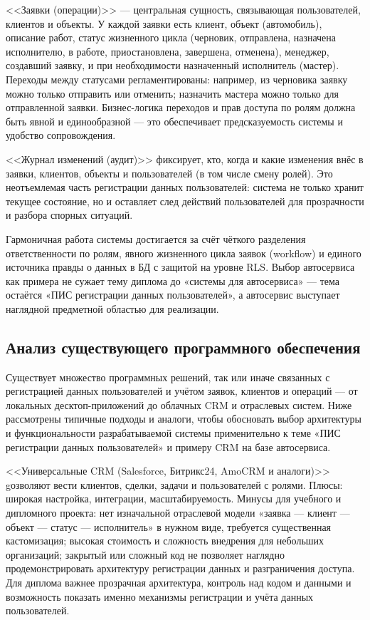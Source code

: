 <<Заявки (операции)>> — центральная сущность, связывающая пользователей, клиентов и объекты. У каждой заявки есть клиент, объект (автомобиль), описание работ, статус жизненного цикла (черновик, отправлена, назначена исполнителю, в работе, приостановлена, завершена, отменена), менеджер, создавший заявку, и при необходимости назначенный исполнитель (мастер). Переходы между статусами регламентированы: например, из черновика заявку можно только отправить или отменить; назначить мастера можно только для отправленной заявки. Бизнес-логика переходов и прав доступа по ролям должна быть явной и единообразной — это обеспечивает предсказуемость системы и удобство сопровождения.

<<Журнал изменений (аудит)>> фиксирует, кто, когда и какие изменения внёс в заявки, клиентов, объекты и пользователей (в том числе смену ролей). Это неотъемлемая часть регистрации данных пользователей: система не только хранит текущее состояние, но и оставляет след действий пользователей для прозрачности и разбора спорных ситуаций.

Гармоничная работа системы достигается за счёт чёткого разделения ответственности по ролям, явного жизненного цикла заявок (workflow) и единого источника правды о данных в БД с защитой на уровне RLS. Выбор автосервиса как примера не сужает тему диплома до «системы для автосервиса» — тема остаётся «ПИС регистрации данных пользователей», а автосервис выступает наглядной предметной областью для реализации.

\subsection{Анализ существующего программного обеспечения}

Существует множество программных решений, так или иначе связанных с регистрацией данных пользователей и учётом заявок, клиентов и операций — от локальных десктоп-приложений до облачных CRM и отраслевых систем. Ниже рассмотрены типичные подходы и аналоги, чтобы обосновать выбор архитектуры и функциональности разрабатываемой системы применительно к теме «ПИС регистрации данных пользователей» и примеру CRM на базе автосервиса.

<<Универсальные CRM (Salesforce, Битрикс24, AmoCRM и аналоги)>> gозволяют вести клиентов, сделки, задачи и пользователей с ролями. Плюсы: широкая настройка, интеграции, масштабируемость. Минусы для учебного и дипломного проекта: нет изначальной отраслевой модели «заявка — клиент — объект — статус — исполнитель» в нужном виде, требуется существенная кастомизация; высокая стоимость и сложность внедрения для небольших организаций; закрытый или сложный код не позволяет наглядно продемонстрировать архитектуру регистрации данных и разграничения доступа. Для диплома важнее прозрачная архитектура, контроль над кодом и данными и возможность показать именно механизмы регистрации и учёта данных пользователей.

